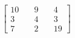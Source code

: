 \documentclass[preview]{standalone}
\begin{document}
\begin{align*}
\begin{bmatrix} 10 & \quad 9 & \quad 4 \\ 3 & \quad 4 & \quad 3 \\ 7 & \quad 2 & \quad 19 \end{bmatrix}
\end{align*}
\end{document}
